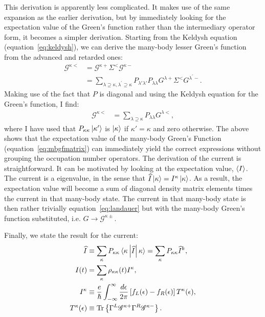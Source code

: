 This derivation is apparently less complicated. It makes use of the same expansion as the earlier derivation, but by immediately looking for the expectation value of the Green's function rather than the intermediary operator form, it becomes a simpler derivation. Starting from the Keldysh equation (equation~\ref{eq:keldysh}), we can derive the many-body lesser Green's function from the advanced and retarded ones:
\begin{align*}
    \mathscr{G}^{\kappa<} &= \mathscr{G}^{\kappa+} \Sigma^< \mathscr{G}^{\kappa-} \\
    &= \sum_{\lambda\supseteq\kappa, \lambda^\prime \supseteq\kappa}P_{\lambda'\lambda'} P_{\lambda\lambda} G^{\lambda+} \Sigma^< G^{\lambda^\prime-}.
\end{align*}
Making use of the fact that $P$ is diagonal and using the Keldysh equation for the Green's function, I find:
\begin{align}
    \mathscr{G}^{\kappa<} &= \sum_{\lambda\supseteq\kappa} P_{\lambda\lambda} G^{\lambda<} \label{eq:mblessergf},
\end{align} where I have used that $P_{\kappa\kappa} \ket{\kappa'}$ is $\ket{\kappa}$ if $\kappa'=\kappa$ and zero otherwise. The above shows that the expectation value of the many-body Green's Function (equation~\ref{eq:mbgfmatrix}) can immediately yield the correct expressions without grouping the occupation number operators.
The derivation of the current is straightforward. It can be motivated by looking at the expectation value,  $\braket{I}$. The current is a eigenvalue, in the sense that $ \widehat{I} \ket{\kappa} = I^\kappa \ket{\kappa}$. As a result, the expectation value will become a sum of diagonal density matrix elements times the current in that many-body state. The current in that many-body state is then rather trivially equation~\ref{eq:landauer} but with the many-body Green's function substituted, i.e. $G \rightarrow \mathscr{G}^{\kappa\pm}$.

Finally, we state the result for the current:
\begin{align*}
\widehat{I} &\equiv \sum_\kappa P_{\kappa\kappa} \braket{ \kappa \left|\widehat{I}\right|\kappa}=\sum_\kappa P_{\kappa\kappa} \widehat{I}^k,\\ 
I(t) &= \sum_\kappa \rho_{\kappa\kappa}(t) I^\kappa, \\
I^\kappa&\equiv \frac{e}{\hslash} \int^\infty_{-\infty} \frac{d\epsilon}{2\pi} \left[ f_L(\epsilon) - f_R (\epsilon) \right] T^\kappa (\epsilon),\\
T^\kappa(\epsilon) &\equiv \text{Tr}\left\{ \Gamma^L \mathscr{G}^{\kappa+} \Gamma^R \mathscr{G}^{\kappa-} \right\}.
\end{align*}



